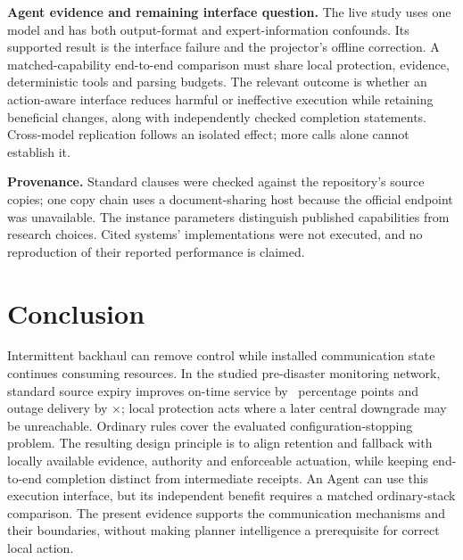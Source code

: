 \documentclass[journal,10pt]{IEEEtran}
\begin{document}
\textbf{Agent evidence and remaining interface question.} The live study uses one model and
has both output-format and expert-information confounds. Its supported result is the interface
failure and the projector's offline correction. A matched-capability end-to-end comparison must
share local protection, evidence, deterministic tools and parsing budgets. The relevant outcome is
whether an action-aware interface reduces harmful or ineffective execution while retaining
beneficial changes, along with independently checked completion statements. Cross-model
replication follows an isolated effect; more calls alone cannot establish it.

\textbf{Provenance.} Standard clauses were checked against the repository's source copies;
one copy chain uses a document-sharing host because the official endpoint was unavailable.
The instance parameters distinguish published capabilities from research choices. Cited systems'
implementations were not executed, and no reproduction of their reported performance is claimed.

\section{Conclusion}
Intermittent backhaul can remove control while installed communication state continues consuming
resources. In the studied pre-disaster monitoring network, standard source expiry improves
on-time service by \cThreePairedPoints\ percentage points and outage delivery by
\cThreeRatio$\times$; local protection acts where a later central downgrade may be unreachable.
Ordinary rules cover the evaluated configuration-stopping problem. The resulting design principle
is to align retention and fallback with locally available evidence, authority and enforceable
actuation, while keeping end-to-end completion distinct from intermediate receipts. An Agent can
use this execution interface, but its independent benefit requires a matched ordinary-stack
comparison. The present evidence supports the communication mechanisms and their boundaries,
without making planner intelligence a prerequisite for correct local action.



\end{document}
